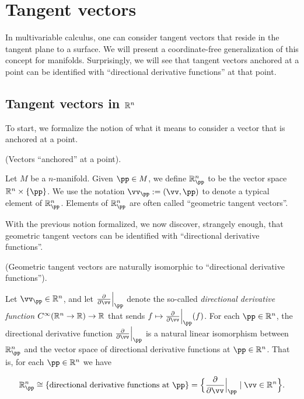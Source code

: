 \newpage

\section{Tangent vectors}

In multivariable calculus, one can consider tangent vectors that reside in the tangent plane to a surface. We will present a coordinate-free generalization of this concept for manifolds. Surprisingly, we will see that tangent vectors anchored at a point can be identified with ``directional derivative functions'' at that point.

\subsection*{Tangent vectors in $\mathbb{R}^n$}

To start, we formalize the notion of what it means to consider a vector that is anchored at a point.

\begin{defn}
     (Vectors ``anchored'' at a point).
    
    Let $M$ be a $n$-manifold. Given $\pp \in M$, we define $\R^n_\pp$ to be the vector space $\R^n \times \{\pp\}$. We use the notation $\vv_\pp := (\vv, \pp)$ to denote a typical element of $\R^n_\pp$. Elements of $\R^n_\pp$ are often called ``geometric tangent vectors''.
\end{defn}

With the previous notion formalized, we now discover, strangely enough, that geometric tangent vectors can be identified with ``directional derivative functions''.

\begin{theorem}
    \label{ch::manifolds::thm::geometric_tangent_vectors_iso_directional_derivative_functions}
    (Geometric tangent vectors are naturally isomorphic to ``directional derivative functions'').
    
     Let $\vv_\pp \in \R^n$, and let $\frac{\pd}{\pd \vv}\Big|_\pp$ denote the so-called \textit{directional derivative function} $C^\infty(\mathbb{R}^n \rightarrow \mathbb{R}) \rightarrow \mathbb{R}$ that sends $f \mapsto \frac{\pd}{\pd \vv}\Big|_\pp (f)$. For each $\pp \in \R^n$, the directional derivative function $\frac{\pd}{\pd \vv}\Big|_\pp$ is a natural linear isomorphism between $\R^n_\pp$ and the vector space of directional derivative functions at $\pp \in \R^n$. That is, for each $\pp \in \R^n$ we have

     \begin{align*}
         \R^n_\pp \cong \{\text{directional derivative functions at $\pp$}\} = \Big\{ \frac{\pd}{\pd \vv}\Big|_\pp \mid \vv \in \R^n \Big\}.
     \end{align*}
\end{theorem}

